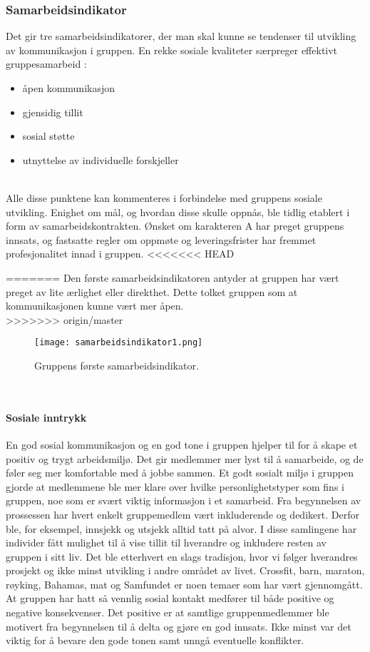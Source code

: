 \subsubsection{Samarbeidsindikator}

Det gir tre samarbeidsindikatorer, der man skal kunne se tendenser til utvikling av kommunikasjon i gruppen.
En rekke sosiale kvaliteter særpreger effektivt gruppesamarbeid \cite{orgorg}:
\\
\begin{itemize}
	\item åpen kommunikasjon
	\item gjensidig tillit
	\item sosial støtte
	\item utnyttelse av individuelle forskjeller
\end{itemize}
\\
Alle disse punktene kan kommenteres i forbindelse med gruppens sosiale utvikling.
Enighet om mål, og hvordan disse skulle oppnås, ble tidlig etablert i form av samarbeidskontrakten.
Ønsket om karakteren A har preget gruppens innsats, og fastsatte regler om oppmøte og leveringsfrister har fremmet profesjonalitet innad i gruppen.
<<<<<<< HEAD

=======
Den første samarbeidsindikatoren antyder at gruppen har vært preget av lite ærlighet eller direkthet.
Dette tolket gruppen som at kommunikasjonen kunne vært mer åpen.
\\
>>>>>>> origin/master
\begin{figure}[h!]
	\begin{center}
		\caption{Gruppens første samarbeidsindikator.}
		\label{fig:samarbeidsindikator}
		\texttt{[image: samarbeidsindikator1.png]}
	\end{center}
\end{figure}
\\
\paragraph{Sosiale inntrykk}
En god sosial kommunikasjon og en god tone i gruppen hjelper til for å skape et positiv og trygt arbeidsmiljø.
Det gir medlemmer mer lyst til å samarbeide, og de føler seg mer komfortable med å jobbe sammen.
Et godt sosialt miljø i gruppen gjorde at medlemmene ble mer klare over hvilke personlighetstyper som fins i gruppen, noe som er svært viktig informasjon i et samarbeid.
Fra begynnelsen av prossessen har hvert enkelt gruppemedlem vært inkluderende og dedikert. 
Derfor ble, for eksempel, innsjekk og utsjekk alltid tatt på alvor.
I disse samlingene har individer fått mulighet til å vise tillit til hverandre og inkludere resten av gruppen i sitt liv. 
Det ble etterhvert en slags tradisjon, hvor vi følger hverandres prosjekt og ikke minst utvikling i andre området av livet.
Crossfit, barn, maraton, røyking, Bahamas, mat og Samfundet er noen temaer som har vært gjennomgått.
\\
At gruppen har hatt så vennlig sosial kontakt medfører til både positive og negative konsekvenser.
Det positive er at samtlige gruppenmedlemmer ble motivert fra begynnelsen til å delta og gjøre en god innsats.
Ikke minst var det viktig for å bevare den gode tonen samt unngå eventuelle konflikter.

